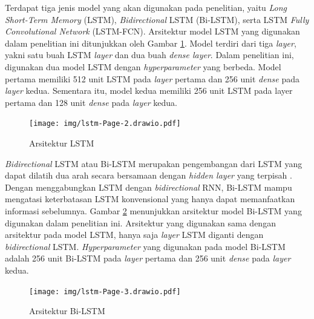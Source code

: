 Terdapat tiga jenis model yang akan digunakan pada penelitian, yaitu \textit{Long Short-Term Memory} (LSTM), \textit{Bidirectional} LSTM (Bi-LSTM), serta LSTM \textit{Fully Convolutional Network} (LSTM-FCN). 
Arsitektur model LSTM yang digunakan dalam penelitian ini ditunjukkan oleh Gambar \ref{fig:arslstm}. Model terdiri dari tiga \textit{layer}, yakni satu buah LSTM \textit{layer} dan dua buah \textit{dense layer}. 
Dalam penelitian ini, digunakan dua model LSTM dengan \textit{hyperparameter} yang berbeda.
Model pertama memiliki 512 unit LSTM pada \textit{layer} pertama dan 256 unit \textit{dense} pada \textit{layer} kedua. Sementara itu, model kedua memiliki 256 unit LSTM pada layer pertama dan 128 unit \textit{dense} pada \textit{layer} kedua.

\begin{figure}[H]
  \centering
  \texttt{[image: img/lstm-Page-2.drawio.pdf]}
  \caption{Arsitektur LSTM}
  \label{fig:arslstm}
\end{figure}

\textit{Bidirectional} LSTM atau Bi-LSTM merupakan pengembangan dari LSTM yang dapat dilatih dua arah secara bersamaan dengan \textit{hidden layer} yang terpisah \parencite{yuReviewRecurrentNeural2019}. Dengan menggabungkan LSTM dengan \textit{bidirectional} RNN, Bi-LSTM mampu mengatasi keterbatasan LSTM konvensional yang hanya dapat memanfaatkan informasi sebelumnya. Gambar \ref{fig:arsbilstm} menunjukkan arsitektur model Bi-LSTM yang digunakan dalam penelitian ini.
Arsitektur yang digunakan sama dengan arsitektur pada model LSTM, hanya saja \textit{layer} LSTM diganti dengan \textit{bidirectional} LSTM.
\textit{Hyperparameter} yang digunakan pada model Bi-LSTM adalah 256 unit Bi-LSTM pada \textit{layer} pertama dan 256 unit \textit{dense} pada \textit{layer} kedua.

\begin{figure}[H]
  \centering
  \texttt{[image: img/lstm-Page-3.drawio.pdf]}
  \caption{Arsitektur Bi-LSTM}
  \label{fig:arsbilstm}
\end{figure}

